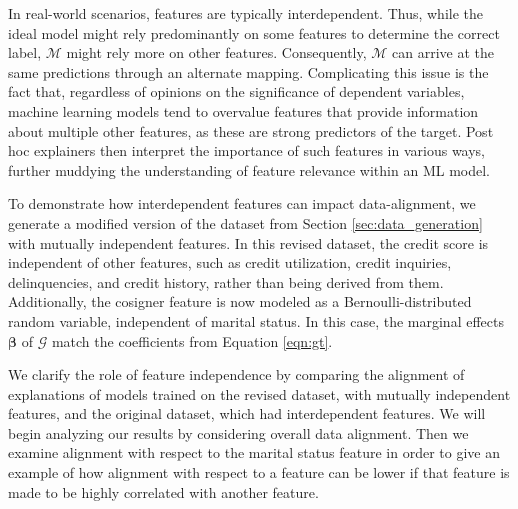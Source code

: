 \documentclass[mnsc,blindrev]{informs3}
\begin{document}
        In real-world scenarios, features are typically interdependent. Thus, while the ideal model might rely predominantly on some features to determine the correct label, $\mathcal{M}$ might rely more on other features. Consequently, $\mathcal{M}$ can arrive at the same predictions through an alternate mapping. Complicating this issue is the fact that, regardless of opinions on the significance of dependent variables, machine learning models tend to overvalue features that provide information about multiple other features, as these are strong predictors of the target. Post hoc explainers then interpret the importance of such features in various ways, further muddying the understanding of feature relevance within an ML model.

         To demonstrate how interdependent features can impact data-alignment, we generate a modified version of the dataset from Section \ref{sec:data_generation} with mutually independent features. In this revised dataset, the credit score is independent of other features, such as credit utilization, credit inquiries, delinquencies, and credit history, rather than being derived from them. Additionally, the cosigner feature is now modeled as a Bernoulli-distributed random variable, independent of marital status. In this case, the marginal effects $\boldsymbol{\beta}$ of $\mathcal{G}$ match the coefficients from Equation \ref{eqn:gt}. %
        

        We clarify the role of feature independence by comparing the alignment of explanations of models trained on the revised dataset, with mutually independent features, and the original dataset, which had interdependent features. We will begin analyzing our results by considering overall data alignment. Then we examine alignment with respect to the marital status feature in order to give an example of how alignment with respect to a feature can be lower if that feature is made to be highly correlated with another feature.
        
\end{document}
